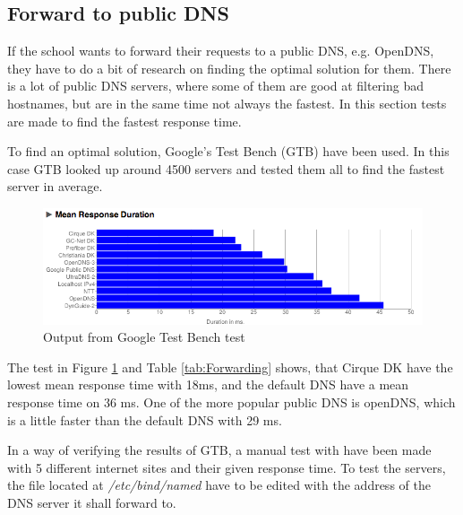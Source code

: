 \documentclass[Preamble]{subfiles}
\begin{document}
\subsection{Forward to public DNS}
If the school wants to forward their requests to a public DNS, e.g. OpenDNS, they have to do a bit of research on finding the optimal solution for them. 
There is a lot of public DNS servers, where some of them are good at filtering bad hostnames, but are in the same time not always the fastest. 
In this section tests are made to find the fastest response time.

To find an optimal solution, Google's Test Bench (GTB) have been used.
In this case GTB looked up around 4500 servers and tested them all to find the fastest server in average.

\begin{figure}[hbtp]
\centering
\includegraphics[scale=0.5]{Figurer/NamebenchTest.png}
\caption{Output from Google Test Bench test}
\label{fig:testBench}
\end{figure}

The test in Figure \ref{fig:testBench} and Table \ref{tab:Forwarding} shows, that Cirque DK have the lowest mean response time with 18ms, and the default DNS have a mean response time on 36 ms. 
One of the more popular public DNS is openDNS, which is a little faster than the default DNS with 29 ms. 

In a way of verifying the results of GTB, a manual test with  have been made with 5 different internet sites and their given response time. 
To test the servers, the file located at \textit{/etc/bind/named} have to be edited with the address of the DNS server it shall forward to. 
\end{document}

